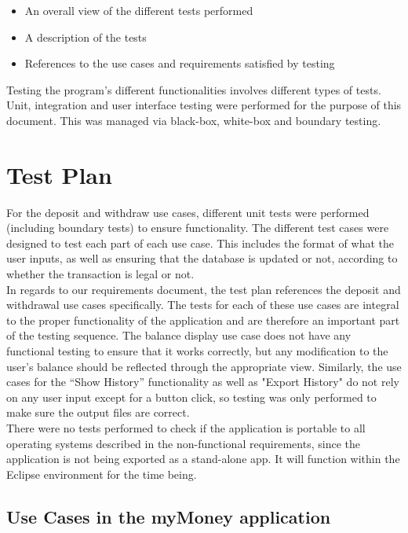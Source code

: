 \documentclass[12pt]{article}
\begin{document}
\begin{itemize}
  \item An overall view of the different tests performed
  \item A description of the tests
  \item References to the use cases and requirements satisfied by testing
\end{itemize}

Testing the program's different functionalities involves different types of tests. Unit, integration and user interface testing were performed for the purpose of this document. This was managed via black-box, white-box and boundary testing.

\section{Test Plan}

For the deposit and withdraw use cases, different unit tests were performed (including boundary tests) to ensure functionality. The different test cases were designed to test each part of each use case. This includes the format of what the user inputs, as well as ensuring that the database is updated or not, according to whether the transaction is legal or not.\\

In regards to our requirements document, the test plan references the deposit and withdrawal use cases specifically. The tests for each of these use cases are integral to the proper functionality of the application and are therefore an important part of the testing sequence. The balance display use case does not have any functional testing to ensure that it works correctly, but any modification to the user's balance should be reflected through the appropriate view. Similarly, the use cases for the ``Show History'' functionality as well as "Export History" do not rely on any user input except for a button click, so testing was only performed to make sure the output files are correct.\\

There were no tests performed to check if the application is portable to all operating systems described in the non-functional requirements, since the application is not being exported as a stand-alone app. It will function within the Eclipse environment for the time being.

\subsection{Use Cases in the myMoney application}
\end{document}
